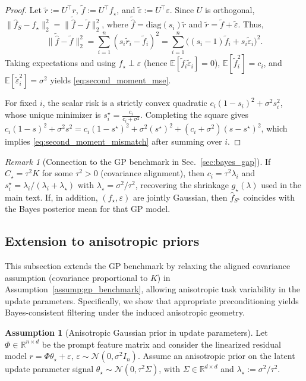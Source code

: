 \documentclass{article}
\theoremstyle{plain}
\theoremstyle{definition}
\newtheorem{assumption}[theorem]{Assumption}
\theoremstyle{remark}
\newtheorem{remark}[theorem]{Remark}
\begin{document}
\begin{proof}
Let $\tilde r:=U^\top r$, $\tilde f:=U^\top f_\star$, and $\tilde\varepsilon:=U^\top\varepsilon$. Since $U$ is orthogonal, $\|\hat f_S-f_\star\|_2^2=\|\widetilde{\hat f}-\tilde f\|_2^2$, where $\widetilde{\hat f}=\mathrm{diag}(s_i)\tilde r$ and $\tilde r=\tilde f+\tilde\varepsilon$.
Thus,
\[
    \|\widetilde{\hat f}-\tilde f\|_2^2
    = \sum_{i=1}^n (s_i\tilde r_i-\tilde f_i)^2
    = \sum_{i=1}^n \bigl((s_i-1)\tilde f_i + s_i\tilde\varepsilon_i\bigr)^2.
\]
Taking expectations and using $f_\star\perp\varepsilon$ (hence $\mathbb E[\tilde f_i\tilde\varepsilon_i]=0$),
$\mathbb E[\tilde f_i^2]=c_i$, and $\mathbb E[\tilde\varepsilon_i^2]=\sigma^2$ yields \eqref{eq:second_moment_mse}.

For fixed $i$, the scalar risk is a strictly convex quadratic
$c_i(1-s_i)^2+\sigma^2 s_i^2$, whose unique minimizer is $s_i^\star = \frac{c_i}{c_i+\sigma^2}$. Completing the square gives $c_i(1-s)^2+\sigma^2 s^2 = c_i(1-s^\star)^2+\sigma^2(s^\star)^2 + (c_i+\sigma^2)(s-s^\star)^2$, which implies \eqref{eq:second_moment_mismatch} after summing over $i$.
\end{proof}


\begin{remark}[Connection to the GP benchmark in Sec.~\ref{sec:bayes_gap}]
If $C_\star=\tau^2 K$ for some $\tau^2>0$ (covariance alignment), then $c_i=\tau^2\lambda_i$ and $s_i^\star=\lambda_i/(\lambda_i+\lambda_\star)$ with $\lambda_\star=\sigma^2/\tau^2$, recovering the shrinkage $g_\star(\lambda)$ used in the main text. If, in addition, $(f_\star,\varepsilon)$ are jointly Gaussian, then $\hat f_{S^\star}$ coincides with the Bayes posterior mean for that GP model.
\end{remark}


\subsection{Extension to anisotropic priors}\label{app:anisotropic}

This subsection extends the GP benchmark by relaxing the aligned covariance assumption (covariance proportional to $K$) in Assumption~\ref{assump:gp_benchmark}, allowing anisotropic task variability in the update parameters. Specifically, we show that appropriate preconditioning yields Bayes-consistent filtering under the induced anisotropic geometry.

\begin{assumption}[Anisotropic Gaussian prior in update parameters]
\label{assump:aniso_theta_prior_app}
Let $\Phi\in\mathbb{R}^{n\times d}$ be the prompt feature matrix and consider the linearized residual model $r=\Phi\theta_\star+\varepsilon,\,
\varepsilon\sim\mathcal{N}(0,\sigma^2 I_n)$. Assume an anisotropic prior on the latent update parameter signal $\theta_\star \sim \mathcal{N}(0,\tau^2\Sigma)$, with $\Sigma\in\mathbb{R}^{d\times d}$ and $\lambda_\star:=\sigma^2/\tau^2$.
\end{assumption}
\end{document}
